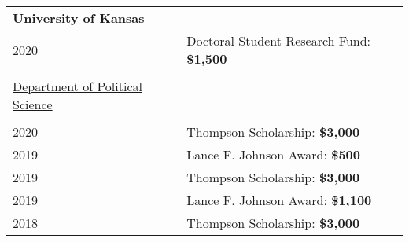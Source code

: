 \documentclass[margin,line,pifont,palatino,courier]{res}
\begin{document}
\begin{resume}
\begin{tabular}{ll}
  \textbf{\underline{University of Kansas}} &\\
  2020       & Doctoral Student Research Fund: \bf{\$1,500}\\
  \\
  \underline{Department of Political Science}&\\
  \\
  2020       & Thompson Scholarship: \bf{\$3,000}\\
  2019       & Lance F. Johnson Award: \bf{\$500}\\
  2019       & Thompson Scholarship: \bf{\$3,000}\\
  2019       & Lance F. Johnson Award: \bf{\$1,100}\\
  2018       & Thompson Scholarship: \bf{\$3,000}\\

\end{tabular}
\end{resume}
\end{document}
